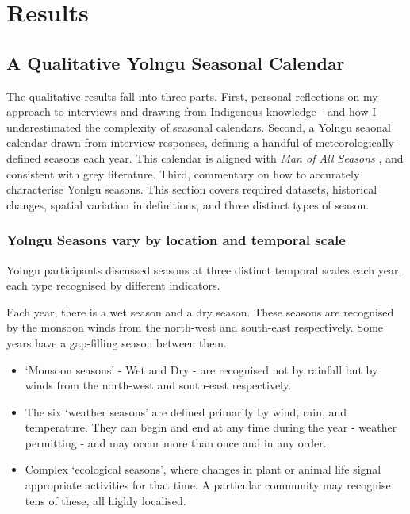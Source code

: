 \chapter{Results}
\label{ch:results}




\section{A Qualitative Yolngu Seasonal Calendar}

The qualitative results fall into three parts.
%
First, personal reflections on my approach to interviews and drawing
from Indigenous knowledge - and how I underestimated the complexity
of seasonal calendars.
%
Second, a Yolngu seaonal calendar drawn from interview responses,
defining a handful of meteorologically-defined seasons each year.
This calendar is aligned with \textit{Man of All Seasons} \citep{davis1989},
and consistent with grey literature.
%
Third, commentary on how to accurately characterise Yonlgu seasons.
This section covers required datasets, historical changes, spatial
variation in definitions, and three distinct types of season.





\subsection{Yolngu Seasons vary by location and temporal scale}

Yolngu participants discussed seasons at three distinct temporal scales
each year, each type recognised by different indicators.

Each year, there is a wet season and a dry season.  These seasons are
recognised by the monsoon winds from the north-west and south-east
respectively.  Some years have a gap-filling season between them.

\begin{itemize}
\item `Monsoon seasons' - Wet and Dry - are recognised not by rainfall but
        by winds from the north-west and south-east respectively.
\item The six `weather seasons' are defined primarily by wind, rain, and temperature.
        They can begin and end at any time during the year - weather permitting -
        and may occur more than once and in any order.
\item Complex `ecological seasons', where changes in plant or animal life
        signal appropriate activities for that time.  A particular community
        may recognise tens of these, all highly localised.
\end{itemize}

